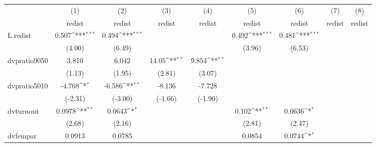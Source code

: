 {
\def\sym#1{\ifmmode^{#1}\else\(^{#1}\)\fi}
\begin{tabular}{l*{8}{c}}
\hline\hline
            &\multicolumn{1}{c}{(1)}&\multicolumn{1}{c}{(2)}&\multicolumn{1}{c}{(3)}&\multicolumn{1}{c}{(4)}&\multicolumn{1}{c}{(5)}&\multicolumn{1}{c}{(6)}&\multicolumn{1}{c}{(7)}&\multicolumn{1}{c}{(8)}\\
            &\multicolumn{1}{c}{redist}&\multicolumn{1}{c}{redist}&\multicolumn{1}{c}{redist}&\multicolumn{1}{c}{redist}&\multicolumn{1}{c}{redist}&\multicolumn{1}{c}{redist}&\multicolumn{1}{c}{redist}&\multicolumn{1}{c}{redist}\\
\hline
L.redist    &       0.507\sym{***}&       0.494\sym{***}&                     &                     &       0.492\sym{***}&       0.481\sym{***}&                     &                     \\
            &      (4.00)         &      (6.49)         &                     &                     &      (3.96)         &      (6.53)         &                     &                     \\
[1em]
dvpratio9050&       3.810         &       6.042         &       14.05\sym{**} &       9.854\sym{**} &                     &                     &                     &                     \\
            &      (1.13)         &      (1.95)         &      (2.81)         &      (3.07)         &                     &                     &                     &                     \\
[1em]
dvpratio5010&      -4.768\sym{*}  &      -6.586\sym{**} &      -8.136         &      -7.728         &                     &                     &                     &                     \\
            &     (-2.31)         &     (-3.00)         &     (-1.66)         &     (-1.90)         &                     &                     &                     &                     \\
[1em]
dvturnout   &      0.0978\sym{**} &      0.0643\sym{*}  &                     &                     &       0.102\sym{**} &      0.0636\sym{*}  &                     &                     \\
            &      (2.68)         &      (2.16)         &                     &                     &      (2.81)         &      (2.47)         &                     &                     \\
[1em]
dvfempar    &      0.0913         &      0.0785         &                     &                     &      0.0854         &      0.0744\sym{*}  &                     &                     \\

\end{tabular}}
